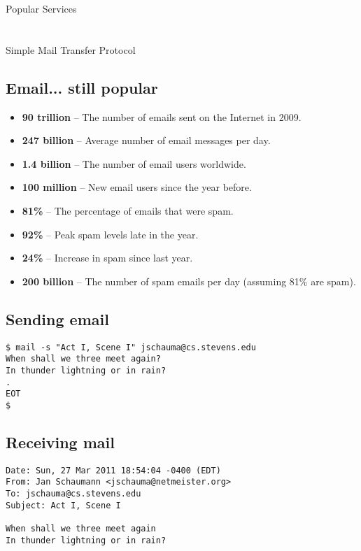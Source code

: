 \documentclass[xga]{xdvislides}
\begin{document}
\newpage
\vspace*{\fill}
\begin{center}
	\Hugesize
		Popular Services \\ [1em]
	\hspace*{5mm}
	\blueline\\
	\hspace*{5mm}\\
		Simple Mail Transfer Protocol
\end{center}
\vspace*{\fill}

\subsection{Email... still popular}
\begin{itemize}
	\item {\bf 90 trillion} – The number of emails sent on the Internet in 2009.
	\item {\bf 247 billion} – Average number of email messages per day.
	\item {\bf 1.4 billion} – The number of email users worldwide.
	\item {\bf 100 million} – New email users since the year before.
	\item {\bf 81\%} – The percentage of emails that were spam.
	\item {\bf 92\%} – Peak spam levels late in the year.
	\item {\bf 24\%} – Increase in spam since last year.
	\item {\bf 200 billion} – The number of spam emails per day (assuming 81\% are spam).
\end{itemize}

\subsection{Sending email}
\begin{verbatim}
$ mail -s "Act I, Scene I" jschauma@cs.stevens.edu
When shall we three meet again?
In thunder lightning or in rain?
.
EOT
$
\end{verbatim}

\subsection{Receiving mail}
\begin{verbatim}
Date: Sun, 27 Mar 2011 18:54:04 -0400 (EDT)
From: Jan Schaumann <jschauma@netmeister.org>
To: jschauma@cs.stevens.edu
Subject: Act I, Scene I

When shall we three meet again
In thunder lightning or in rain?

\end{verbatim}
\end{document}
